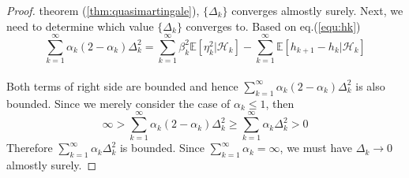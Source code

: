 \begin{proof}
    theorem (\ref{thm:quasimartingale}), $\{\Delta_{k}\}$ converges almostly surely. Next, we need to determine which
    value $\{\Delta_{k}\}$ converges to. Based on eq.(\ref{equ:hk})
    \begin{equation*}
      \sum_{k=1}^{\infty}{\alpha_{k}(2-\alpha_{k}) \Delta_{k}^{2}} = \sum_{k=1}^{\infty}{\beta_{k}^{2}
      \mathbb{E}[\eta_{k}^{2}|\mathcal{H}_{k}]} - \sum_{k=1}^{\infty} {\mathbb{E}[h_{k+1} - h_{k}|\mathcal{H}_{k}]}
    \end{equation*}
    \\ Both terms of right side are bounded and hence $\sum_{k=1}^{\infty}{\alpha_{k}(2-\alpha_{k}) \Delta_{k}^{2}} $ is
    also bounded. Since we merely consider the case of $\alpha_{k} \le 1$, then
    \begin{equation*}
      \infty > \sum_{k=1}^{\infty}{\alpha_{k}(2-\alpha_{k}) \Delta_{k}^{2}} \ge \sum_{k=1}^{\infty}{\alpha_{k}
      \Delta_{k}^{2}} > 0
    \end{equation*}
    Therefore $\sum_{k=1}^{\infty}{\alpha_{k} \Delta_{k}^{2}}$ is bounded. Since $\sum_{k=1}^{\infty}{\alpha_{k}}=\infty$,
    we must have $\Delta_{k} \to 0$ almostly surely.
  \end{proof}
